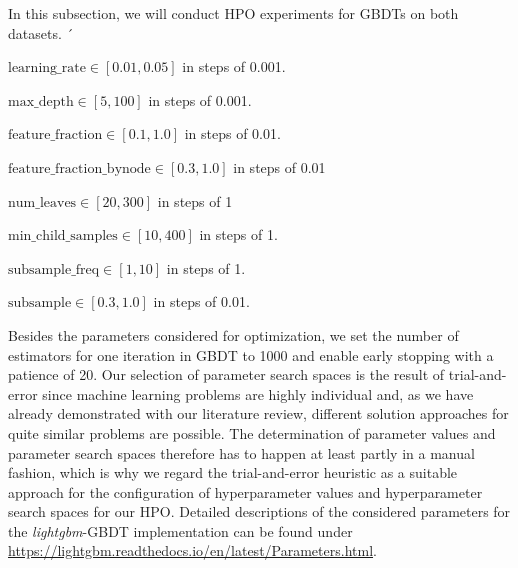 In this subsection, we will conduct HPO experiments for GBDTs on both datasets. 
´
\begin{description}[font=$\bullet$\scshape\bfseries]
	\item $ \text{learning\_rate} \in [0.01, 0.05] $  in steps of 0.001.
	\item $ \text{max\_depth} \in [5, 100] $ in steps of 0.001.
	\item $ \text{feature\_fraction} \in [0.1, 1.0] $ in steps of 0.01.
	\item $ \text{feature\_fraction\_bynode} \in [0.3, 1.0] $ in steps of 0.01
	\item $ \text{num\_leaves} \in [20, 300] $ in steps of 1
	\item $ \text{min\_child\_samples} \in [10, 400] $ in steps of 1.
	\item $ \text{subsample\_freq} \in [1, 10] $ in steps of 1.
	\item $ \text{subsample} \in [0.3, 1.0] $ in steps of 0.01.
\end{description}
Besides the parameters considered for optimization, we set the number of estimators for one iteration in GBDT to 1000 and enable early stopping with a patience of 20. Our selection of parameter search spaces is the result of trial-and-error since machine learning problems are highly individual and, as we have already demonstrated with our literature review, different solution approaches for quite similar problems are possible. The determination of parameter values and parameter search spaces therefore has to happen at least partly in a manual fashion, which is why we regard the trial-and-error heuristic as a suitable approach for the configuration of hyperparameter values and hyperparameter search spaces for our HPO. Detailed descriptions of the considered parameters for the \textit{lightgbm}-GBDT implementation can be found under \url{https://lightgbm.readthedocs.io/en/latest/Parameters.html}.

